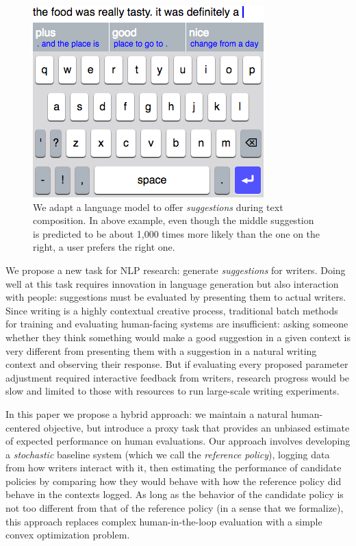 \documentclass[11pt,letterpaper]{article}
\begin{document}
\begin{figure}[t]
\centering\includegraphics[width=.9\columnwidth,trim={0 2cm 0 0.1cm},clip]{definitelyANice}
\caption{\label{fig:ui}
We adapt a language model to offer
\emph{suggestions} during text composition.
%
In above example, even though the middle suggestion is predicted to be about 1,000 times more likely than the one on the right, a user prefers the
right one.
%
%
}
\end{figure}

We propose a new task for NLP research: generate \emph{suggestions} for writers. Doing well at this task requires innovation in language generation but also interaction with people: suggestions must be evaluated by presenting them to actual writers. Since writing is a highly contextual creative process, traditional batch methods for training and evaluating human-facing systems are insufficient: asking someone whether they think something would make a good suggestion in a given context is very different from presenting them with a suggestion in a natural writing context and observing their response. But if evaluating every proposed parameter adjustment required interactive feedback from writers, research progress would be slow and limited to those with resources to run large-scale writing experiments.

In this paper we propose a hybrid approach: we maintain a natural human-centered objective, but introduce a proxy task that provides an unbiased estimate of expected performance on human evaluations. Our approach involves developing a \emph{stochastic} baseline system (which we call the \emph{reference policy}), logging data from how writers interact with it, then estimating the performance of candidate policies by comparing how they would behave with how the reference policy did behave in the contexts logged. As long as the behavior of the candidate policy is not too different from that of the reference policy (in a sense that we formalize), this approach replaces complex human-in-the-loop evaluation with a simple convex optimization problem.
\end{document}
